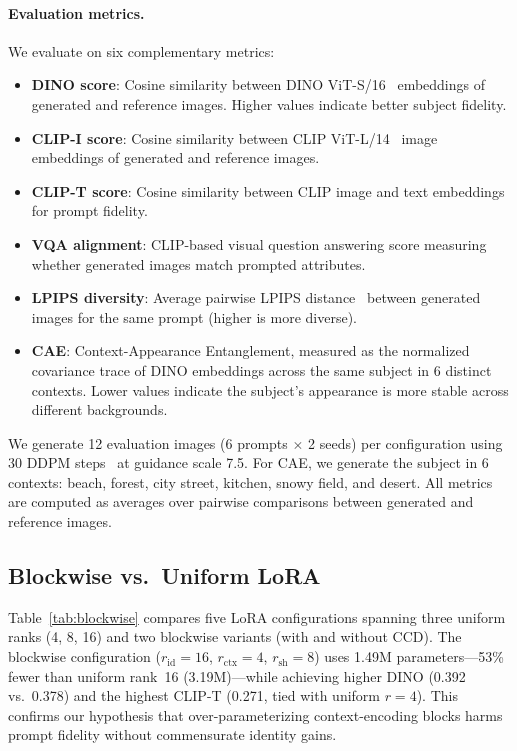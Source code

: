 \documentclass{article}
\begin{document}
\paragraph{Evaluation metrics.}
We evaluate on six complementary metrics:
\begin{itemize}
    \item \textbf{DINO score}: Cosine similarity between DINO ViT-S/16~\citep{caron2021dino} embeddings of generated and reference images.
    Higher values indicate better subject fidelity.
    \item \textbf{CLIP-I score}: Cosine similarity between CLIP ViT-L/14~\citep{radford2021clip} image embeddings of generated and reference images.
    \item \textbf{CLIP-T score}: Cosine similarity between CLIP image and text embeddings for prompt fidelity.
    \item \textbf{VQA alignment}: CLIP-based visual question answering score measuring whether generated images match prompted attributes.
    \item \textbf{LPIPS diversity}: Average pairwise LPIPS distance~\citep{zhang2018lpips} between generated images for the same prompt (higher is more diverse).
    \item \textbf{CAE}: Context-Appearance Entanglement, measured as the normalized covariance trace of DINO embeddings across the same subject in 6 distinct contexts.
    Lower values indicate the subject's appearance is more stable across different backgrounds.
\end{itemize}

We generate 12 evaluation images (6 prompts $\times$ 2 seeds) per configuration using 30 DDPM steps~\citep{ho2020denoising} at guidance scale 7.5.
For CAE, we generate the subject in 6 contexts: beach, forest, city street, kitchen, snowy field, and desert.
All metrics are computed as averages over pairwise comparisons between generated and reference images.

\subsection{Blockwise vs.\ Uniform LoRA}
\label{sec:ablation_blockwise}

Table~\ref{tab:blockwise} compares five LoRA configurations spanning three uniform ranks (4, 8, 16) and two blockwise variants (with and without CCD).
The blockwise configuration ($r_{\text{id}}{=}16$, $r_{\text{ctx}}{=}4$, $r_{\text{sh}}{=}8$) uses 1.49M parameters---53\% fewer than uniform rank~16 (3.19M)---while achieving higher DINO (0.392 vs.\ 0.378) and the highest CLIP-T (0.271, tied with uniform $r{=}4$).
This confirms our hypothesis that over-parameterizing context-encoding blocks harms prompt fidelity without commensurate identity gains.
\end{document}
